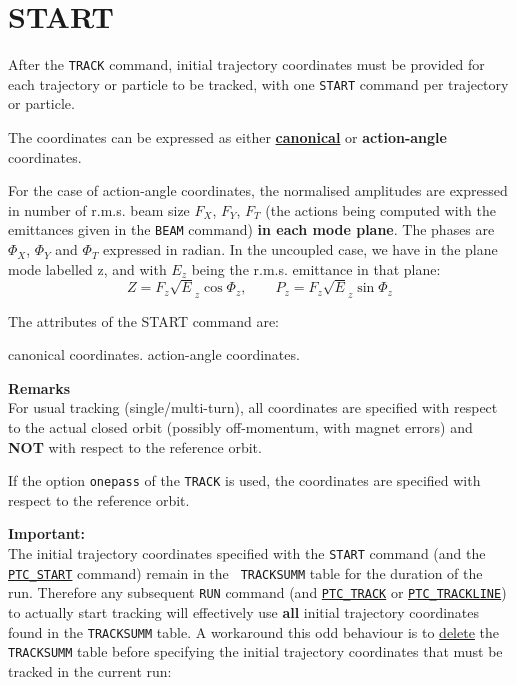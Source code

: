           

\section{START}          
\label{sec:start}

After the {\tt TRACK} command, initial trajectory coordinates must be
provided for each trajectory or particle to be tracked, with one
{\tt START} command per trajectory or particle.

The coordinates can be expressed as either
\href{../Introduction/tables.html#canon}{{\bf canonical}}
or {\bf action-angle} coordinates.


For the case of action-angle coordinates, the normalised amplitudes are
expressed in number of r.m.s. beam size $F_X$, $F_Y$, $F_T$ (the actions
being computed with the emittances given in the {\tt BEAM} command)
{\bf in each mode plane}. 
The phases are $\Phi_X$, $\Phi_Y$ and $\Phi_T$ expressed in
radian. In the uncoupled case, we have in the plane mode labelled z, and
with $E_z$ being the r.m.s. emittance in that plane:\\
\begin{equation}
Z = F_z \sqrt E_z \cos\Phi_z , \qquad P_z= F_z \sqrt E_z \sin\Phi_z
\end{equation}

The attributes of the START command are:
\begin{madlist}
   canonical coordinates. 
   action-angle coordinates.
\end{madlist}

{\bf Remarks} \\
For usual tracking (single/multi-turn), all coordinates are specified
with respect to the actual closed orbit (possibly off-momentum, with
magnet errors) and {\bf NOT} with respect to the reference orbit.

If the option {\tt onepass} of the {\tt TRACK} is used, the
coordinates are specified with respect to the reference orbit.

{\bf Important:} \\
The initial trajectory coordinates specified with the {\tt START} command (and 
the \hyperref[sec:ptc_start]{\tt PTC\_START} command) remain in the {\tt 
TRACKSUMM} table for the duration of the \madx run. Therefore any subsequent 
{\tt RUN} command (and \hyperref[sec:ptc_trcak]{\tt PTC\_TRACK} or 
\hyperref[sec:ptc_trackline]{\tt PTC\_TRACKLINE}) to actually start tracking 
will effectively use {\bf all} 
initial trajectory coordinates found in the {\tt TRACKSUMM} table.
A workaround this odd behaviour is to \hyperref[sec:delete]{delete} the {\tt 
TRACKSUMM} table before 
specifying the initial trajectory coordinates that must be tracked in the 
current run:



